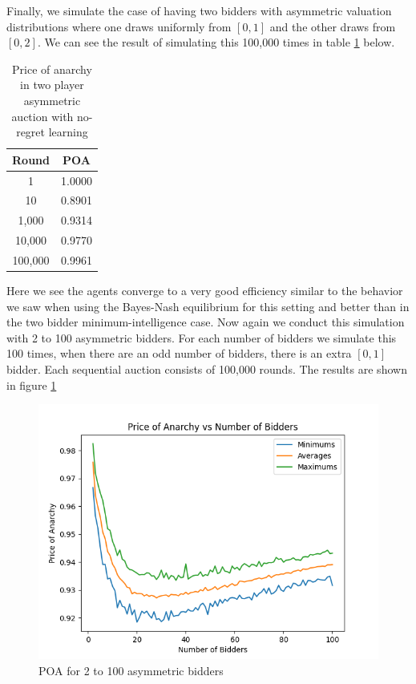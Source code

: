 \documentclass[12pt,twoside]{reedthesis}
\begin{document}
Finally, we simulate the case of having two bidders with asymmetric valuation distributions where one draws uniformly from $[0,1]$ and the other draws from $[0,2]$. We can see the result of simulating this 100,000 times in table \ref{table:5} below.

\begin{table}[h!]
	\begin{center}
		\begin{tabular}{ |c|c| }
			\hline
			Round & POA \\
			\hline
			1 & 1.0000 \\
			10 & 0.8901 \\
			1,000 & 0.9314 \\
			10,000 & 0.9770 \\
			100,000 & 0.9961 \\
			\hline
		\end{tabular}
		\caption{Price of anarchy in two player asymmetric auction with no-regret learning}
		\label{table:5}
	\end{center} 
\end{table}

Here we see the agents converge to a very good efficiency similar to the behavior we saw when using the Bayes-Nash equilibrium for this setting and better than in the two bidder minimum-intelligence case. Now again we conduct this simulation with 2 to 100 asymmetric bidders. For each number of bidders we simulate this 100 times, when there are an odd number of bidders, there is an extra $[0,1]$ bidder. Each sequential auction consists of 100,000 rounds. The results are shown in figure \ref{figure:asymmetric}

\begin{figure}[h!]
	\centering
	\includegraphics[scale=.8]{Figures/asymmetric}
	\caption{POA for 2 to 100 asymmetric bidders}
	\label{figure:asymmetric}
\end{figure}
\end{document}
